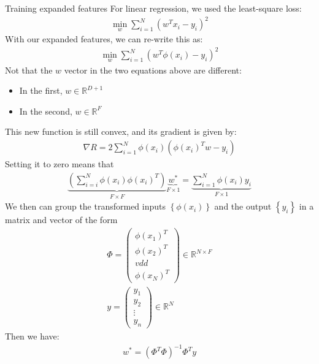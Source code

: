 \begin{parag}{Training expanded features}
    For linear regression, we used the least-square loss:
	\begin{align*} 
		\min_w \sum_{i= 1}^{N}\left(w^{T}x_i - y_i\right)^2
	\end{align*}
	With our expanded features, we can re-write this as:
	\begin{align*} 
		\min_w \sum_{i= 1}^{N}\left(w^{T}\phi\left(x_i\right) - y_i\right)^2
	\end{align*}
	Not that the $w$ vector in the two equations above are different:
	\begin{itemize}
	    \item  In the first, $w \in \mathbb{R}^{D + 1}$
	    \item In the second, $w \in \mathbb{R}^{F}$
	\end{itemize}
	This new function is still convex, and its gradient is given by:
	\begin{align*} \nabla R =  2 \sum_{i= 1}^{N}\phi\left(x_i\right)\left(\phi\left(x_i\right)^{T}w - y_i\right) \end{align*}
	Setting it to zero means that
	\begin{align*} \underbrace{\left(\sum_{i= i}^{N}\phi\left(x_i\right)\phi\left(x_i\right)^{T}\right)}_{F \times F}\underbrace{w^{\ast}}_{F \times 1} =  \underbrace{\sum_{i= 1}^{N}\phi\left(x_i\right)y_i}_{F \times 1} \end{align*}
	We then can group the transformed inputs $\left\{\phi\left(x_i\right)\right\}$ and the output $\left\{y_i\right\}$ in a matrix and vector of the form
	\begin{align*} 
		\Phi = \begin{pmatrix} \phi\left(x_1\right)^{T} \\ \phi\left(x_2\right)^{T} \\ vdd  \\ \phi\left(x_N\right)^{T} \end{pmatrix}  \in \mathbb{R}^{N \times F}\\
		y =  \begin{pmatrix} y_1 \\ y_2 \\ \vdots \\ y_n \end{pmatrix} \in \mathbb{R}^{N}
	\end{align*}
	Then we have:
	\begin{align*} 
		w^{\ast} = \left(\Phi^{T}\Phi\right)^{-1} \Phi^{T}y
	\end{align*}
	
\end{parag}
